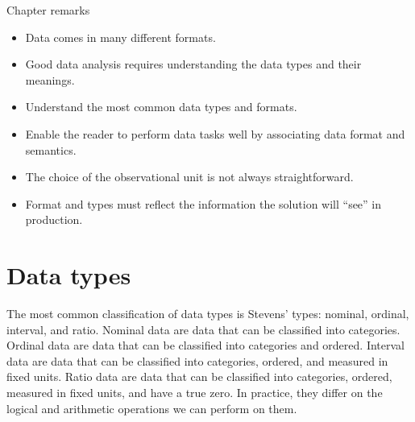 \begin{mainbox}{Chapter remarks}


  \startcontents[chapters]
  \vspace{1em}


  \begin{itemize}
    \itemsep0em
    \item Data comes in many different formats.
    \item Good data analysis requires understanding the data types and their meanings.
  \end{itemize}


  \begin{itemize}
    \itemsep0em
    \item Understand the most common data types and formats.
    \item Enable the reader to perform data tasks well by associating data format and semantics.
  \end{itemize}


  \begin{itemize}
    \itemsep0em
    \item The choice of the observational unit is not always straightforward.
    \item Format and types must reflect the information the solution will ``see'' in
      production.
  \end{itemize}
\end{mainbox}

{}
\clearpage

\section{Data types}

The most common classification of data types is Stevens' types: nominal, ordinal,
interval, and ratio.  Nominal data are data that can be classified into categories.
Ordinal data are data that can be classified into categories and ordered.  Interval data
are data that can be classified into categories, ordered, and measured in fixed units.
Ratio data are data that can be classified into categories, ordered, measured in fixed
units, and have a true zero.  In practice, they differ on the logical and arithmetic operations
we can perform on them.

